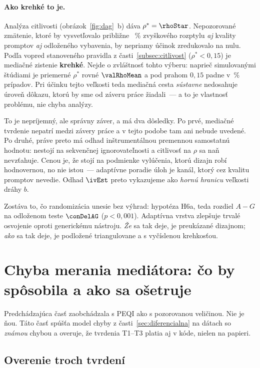 \paragraph{Ako krehké to je.} Analýza citlivosti (obrázok~\ref{fig:dag}~b) dáva $\rho^\ast = \rhoStar$. Nepozorované zmätenie, ktoré by vysvetľovalo približne \rhoPct{}~\% zvyškového rozptylu \emph{aj} kvality promptov \emph{aj} odloženého vybavenia, by nepriamy účinok zredukovalo na nulu. Podľa vopred stanoveného pravidla z časti~\ref{subsec:citlivost} ($\rho^\ast < 0{,}15$) je mediačné zistenie \textbf{krehké}. Nejde o zvláštnosť tohto výberu: naprieč \valReps{} simulovanými štúdiami je priemerné $\rho^\ast$ rovné $\valRhoMean$ a pod prahom $0{,}15$ padne v \valRhoFragile\,\% prípadov. Pri účinku tejto veľkosti teda mediačná cesta \emph{sústavne} nedosahuje úroveň dôkazu, ktorú by sme od záveru práce žiadali~--- a to je vlastnosť problému, nie chyba analýzy.

To je nepríjemný, ale správny záver, a má dva dôsledky. Po prvé, mediačné tvrdenie nepatrí medzi závery práce a v tejto podobe tam ani nebude uvedené. Po druhé, práve preto má odhad inštrumentálnou premennou samostatnú hodnotu: nestojí na sekvenčnej ignorovateľnosti a citlivosť na $\rho$ sa naň nevzťahuje. Cenou je, že stojí na podmienke vylúčenia, ktorú dizajn robí hodnovernou, no nie istou~--- adaptívne poradie úloh je kanál, ktorý cez kvalitu promptov nevedie. Odhad $\ivEst$ preto vykazujeme ako \emph{hornú hranicu} veľkosti dráhy $b$.

Zostáva to, čo randomizácia unesie bez výhrad: hypotéza H6a, teda rozdiel $A-G$ na odloženom teste $\conDelAG$ ($p<0{,}001$). Adaptívna vrstva zlepšuje trvalé osvojenie oproti generickému nástroju. \emph{Že} sa tak deje, je preukázané dizajnom; \emph{ako} sa tak deje, je podložené triangulovane a s vyčíslenou krehkosťou.

\section{Chyba merania mediátora: čo by spôsobila a ako sa ošetruje}
\label{sec:vysledky-merania}

Predchádzajúca časť zaobchádzala s PEQI ako s pozorovanou veličinou. Nie je ňou. Táto časť spúšťa model chyby z časti~\ref{sec:diferencialna} na dátach so \emph{známou} chybou a overuje, že tvrdenia T1--T3 platia aj v kóde, nielen na papieri.

\subsection{Overenie troch tvrdení}

